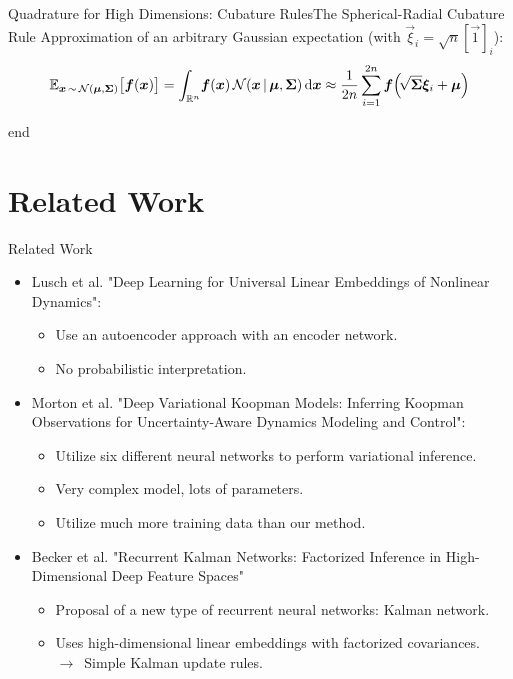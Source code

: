 \documentclass[
	aspectratio=43,
	color={accentcolor=1c},
	logo=false,
	colorframetitle=true,
]{tudabeamer}
\begin{document}
\begin{frame}{Quadrature for High Dimensions: Cubature Rules}{The Spherical-Radial Cubature Rule}
			\vspace{0.3cm}
			Approximation of an arbitrary Gaussian expectation (with \( \vec{\xi}_i = \sqrt{n} [\vec{1}]_i \)):
			\vspace{-0.1cm}
			\begin{equation*}
				\mathbb{E}_{\bm{x} \,\sim\, \mathcal{N}(\bm{\mu}, \bm{\Sigma})}\big[ \bm{f}(\bm{x}) \big]
					= \int_{\mathbb{R}^n} \! \bm{f}(\bm{x}) \, \mathcal{N}(\bm{x} \,\vert\, \bm{\mu}, \bm{\Sigma}) \dd{\bm{x}}
					\approx \frac{1}{2n} \sum_{i = 1}^{2n} \bm{f}\Big(\! \sqrt{\bm{\Sigma}} \bm{\xi}_i + \bm{\mu} \Big)
			\end{equation*}
		\end{frame}
	 end

	\section{Related Work}
		\begin{frame}{Related Work}
			\begin{itemize}
				\item<+-> Lusch et al. "Deep Learning for Universal Linear Embeddings of Nonlinear Dynamics":
					\begin{itemize}
						\item Use an autoencoder approach with an encoder network.
						\item No probabilistic interpretation.
					\end{itemize}
				\item<+-> Morton et al. "Deep Variational Koopman Models: Inferring Koopman Observations for Uncertainty-Aware Dynamics Modeling and Control":
					\begin{itemize}
						\item Utilize six different neural networks to perform variational inference.
						\item Very complex model, lots of parameters.
						\item Utilize much more training data than our method.
					\end{itemize}
				\item<+-> Becker et al. "Recurrent Kalman Networks: Factorized Inference in High-Dimensional Deep Feature Spaces"
					\begin{itemize}
						\item Proposal of a new type of recurrent neural networks: Kalman network.
						\item Uses high-dimensional linear embeddings with factorized covariances. \\
						\quad \(\longrightarrow\,\) Simple Kalman update rules.
					\end{itemize}
			\end{itemize}
		\end{frame}
\end{document}
